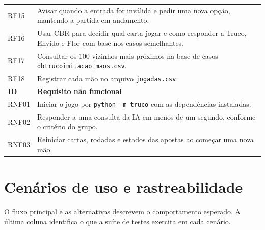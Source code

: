 \documentclass[11pt,a4paper]{article}
\begin{document}
\begin{longtable}{>{\raggedright\arraybackslash}p{}>{\raggedright\arraybackslash}p{}}
RF15 & Avisar quando a entrada for inválida e pedir uma nova opção, mantendo a partida em andamento. \\
RF16 & Usar CBR para decidir qual carta jogar e como responder a Truco, Envido e Flor com base nos casos semelhantes. \\
RF17 & Consultar os 100 vizinhos mais próximos na base de casos \texttt{dbtrucoimitacao\_maos.csv}. \\
RF18 & Registrar cada mão no arquivo \texttt{jogadas.csv}. \\
\midrule
\rowcolor{cabecalho}\textbf{ID} & \textbf{Requisito não funcional} \\
\midrule
RNF01 & Iniciar o jogo por \texttt{python -m truco} com as dependências instaladas. \\
RNF02 & Responder a uma consulta da IA em menos de um segundo, conforme o critério do grupo. \\
RNF03 & Reiniciar cartas, rodadas e estados das apostas ao começar uma nova mão. \\
\bottomrule
\end{longtable}

\section{Cenários de uso e rastreabilidade}

O fluxo principal e as alternativas descrevem o comportamento esperado. A última coluna identifica o que a suíte de testes exercita em cada cenário.
\end{document}
